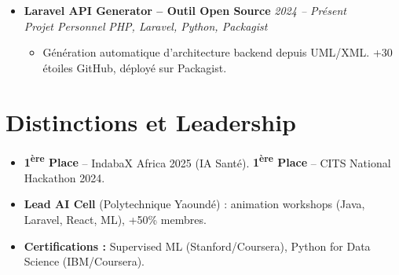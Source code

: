 \documentclass[a4paper,11pt]{article}
\begin{document}
\begin{itemize}[leftmargin=*, label={-}]
\item \textbf{Laravel API Generator -- Outil Open Source} \hfill \textit{2024 -- Présent} \\
\textit{Projet Personnel} \hfill \textit{PHP, Laravel, Python, Packagist}
\vspace{-2pt}
    \begin{itemize}[leftmargin=0.4cm, nosep, label=\tiny$\bullet$]
        \item \small{Génération automatique d'architecture backend depuis UML/XML. +30 étoiles GitHub, déployé sur Packagist.}
    \end{itemize}
\vspace{3pt}

\end{itemize}

\section{Distinctions et Leadership}
\begin{itemize}[leftmargin=*, label=\tiny$\bullet$, nosep]
    \item \small{\textbf{1\textsuperscript{ère} Place} -- IndabaX Africa 2025 (IA Santé). \textbf{1\textsuperscript{ère} Place} -- CITS National Hackathon 2024.}
    \item \small{\textbf{Lead AI Cell} (Polytechnique Yaoundé) : animation workshops (Java, Laravel, React, ML), +50\% membres.}
    \item \small{\textbf{Certifications :} Supervised ML (Stanford/Coursera), Python for Data Science (IBM/Coursera).}
\end{itemize}
\end{document}
